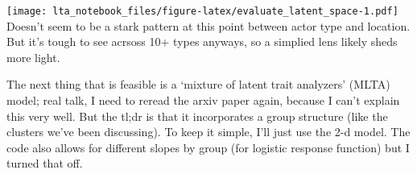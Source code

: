 \documentclass[
]{article}
\newenvironment{Shaded}{\begin{snugshade}}{\end{snugshade}}
\newcommand{\DataTypeTok}[1]{\textcolor[rgb]{0.13,0.29,0.53}{#1}}
\newcommand{\DecValTok}[1]{\textcolor[rgb]{0.00,0.00,0.81}{#1}}
\newcommand{\FloatTok}[1]{\textcolor[rgb]{0.00,0.00,0.81}{#1}}
\newcommand{\KeywordTok}[1]{\textcolor[rgb]{0.13,0.29,0.53}{\textbf{#1}}}
\newcommand{\NormalTok}[1]{#1}
\newcommand{\OperatorTok}[1]{\textcolor[rgb]{0.81,0.36,0.00}{\textbf{#1}}}
\newcommand{\StringTok}[1]{\textcolor[rgb]{0.31,0.60,0.02}{#1}}
\begin{document}
\begin{Shaded}
\end{Shaded}

\texttt{[image: lta\_notebook\_files/figure-latex/evaluate\_latent\_space-1.pdf]}
Doesn't seem to be a stark pattern at this point between actor type and
location. But it's tough to see acrsoss 10+ types anyways, so a simplied
lens likely sheds more light.

The next thing that is feasible is a `mixture of latent trait analyzers'
(MLTA) model; real talk, I need to reread the arxiv paper again, because
I can't explain this very well. But the tl;dr is that it incorporates a
group structure (like the clusters we've been discussing). To keep it
simple, I'll just use the 2-d model. The code also allows for different
slopes by group (for logistic response function) but I turned that off.
\end{document}
